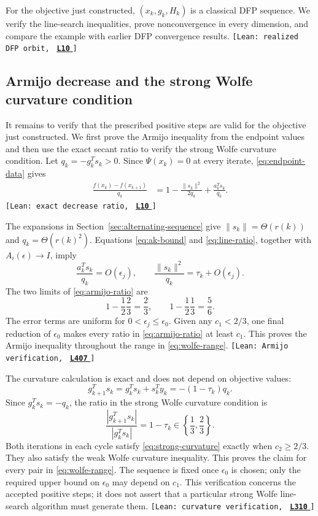 \documentclass[11pt]{article}
\newcommand{\leanLinkText}[1]{%
  \underline{\textbf{#1}}%
}
\newcommand{\leanSnapshot}{e308927f5b7930bdd002f0c0e42b9d112ad821cb}
\newcommand{\leanClaimTag}[3]{%
  {\footnotesize\texttt{[Lean: #1, }}%
  \href{https://github.com/imathwy/DFP_wolfe_local/blob/\leanSnapshot/#2?plain=1\#L#3}%
    {\leanLinkText{\footnotesize\texttt{L#3}}}%
  {\footnotesize\texttt{]}}\enspace
}
\begin{document}
For the objective just constructed, $(x_k,g_k,H_k)$ is a classical DFP
sequence.  We verify the line-search inequalities, prove nonconvergence in
every dimension, and compare the example with earlier DFP convergence results.
\leanClaimTag{realized DFP orbit}{DFPWolfe/A_uniformly_convex_counterexample_to_global_convergence_of_DFP_under_weak_Wolfe_/Proposition_5_14_The_realized_endpoint_sequence_is_the_exact_classical_DFP_orbit.lean}{10}

\subsection{Armijo decrease and the strong Wolfe curvature condition}

It remains to verify that the prescribed positive steps are valid for the
objective just constructed.  We first prove the Armijo inequality
from the endpoint values and then use the exact secant ratio to verify the
strong Wolfe curvature condition.  Let $q_k=-g_k^Ts_k>0$.  Since
$\Psi(x_k)=0$ at every iterate,
\eqref{eq:endpoint-data} gives
\begin{align}
\frac{f(x_k)-f(x_{k+1})}{q_k}
&=1-\frac{\|s_k\|^2}{2q_k}
+\frac{a_k^Ts_k}{q_k}.
\label{eq:armijo-ratio}
\end{align}
\leanClaimTag{exact decrease ratio}{DFPWolfe/A_uniformly_convex_counterexample_to_global_convergence_of_DFP_under_weak_Wolfe_/Lemma_6_1_Exact_Armijo_decrease_ratio_identity.lean}{10}
The expansions in Section~\ref{sec:alternating-sequence} give
$\|s_k\|=\Theta(r(k))$ and
$q_k=\Theta(r(k)^2)$.  Equations \eqref{eq:ak-bound} and
\eqref{eq:line-ratio}, together with $A_i(\epsilon)\to I$, imply
\[
\frac{a_k^Ts_k}{q_k}=O(\epsilon_j),
\qquad
\frac{\|s_k\|^2}{q_k}=\tau_k+O(\epsilon_j).
\]
The two limits of \eqref{eq:armijo-ratio} are
\[
1-\frac12\frac23=\frac23,
\qquad
1-\frac12\frac13=\frac56.
\]
The error terms are uniform for $0<\epsilon_j\le\epsilon_0$.  Given any
$c_1<2/3$, one final reduction of $\epsilon_0$ makes every ratio in
\eqref{eq:armijo-ratio} at least $c_1$.  This proves the Armijo inequality
throughout the range in \eqref{eq:wolfe-range}.
\leanClaimTag{Armijo verification}{ReasLib/Optimization/DFP/TwoPhaseOrbit/ParameterizedWolfe.lean}{407}

The curvature calculation is exact and does not depend on objective values:
\[
g_{k+1}^Ts_k=g_k^Ts_k+s_k^Ty_k
=-(1-\tau_k)q_k.
\]
Since $g_k^Ts_k=-q_k$, the ratio in the strong Wolfe curvature condition is
\[
\frac{|g_{k+1}^Ts_k|}{|g_k^Ts_k|}=1-\tau_k
\in\left\{\frac13,\frac23\right\}.
\]
Both iterations in each cycle satisfy \eqref{eq:strong-curvature} exactly when
$c_2\ge2/3$.  They also satisfy the weak Wolfe curvature inequality.  This
proves the claim for every pair in \eqref{eq:wolfe-range}.  The sequence is fixed once
$\epsilon_0$ is chosen; only the required upper bound on $\epsilon_0$ may
depend on $c_1$.  This verification concerns the accepted positive steps; it
does not assert that a particular strong Wolfe line-search algorithm must
generate them.
\leanClaimTag{curvature verification}{ReasLib/Optimization/DFP/TwoPhaseOrbit/ParameterizedWolfe.lean}{310}
\end{document}
